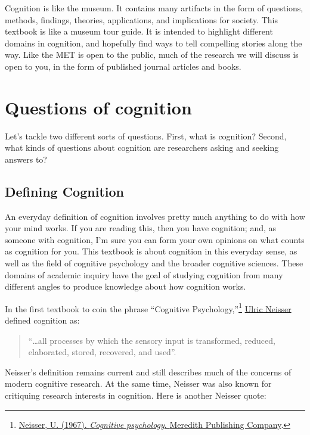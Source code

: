 \documentclass[
  oneside,
  12pt]{crumpbook}
\begin{document}
Cognition is like the museum. It contains many artifacts in the form of questions, methods, findings, theories, applications, and implications for society. This textbook is like a museum tour guide. It is intended to highlight different domains in cognition, and hopefully find ways to tell compelling stories along the way. Like the MET is open to the public, much of the research we will discuss is open to you, in the form of published journal articles and books.

\hypertarget{questions-of-cognition}{%
\section{Questions of cognition}\label{questions-of-cognition}}

Let's tackle two different sorts of questions. First, what is cognition? Second, what kinds of questions about cognition are researchers asking and seeking answers to?

\hypertarget{defining-cognition}{%
\subsection{Defining Cognition}\label{defining-cognition}}

An everyday definition of cognition involves pretty much anything to do with how your mind works. If you are reading this, then you have cognition; and, as someone with cognition, I'm sure you can form your own opinions on what counts as cognition for you. This textbook is about cognition in this everyday sense, as well as the field of cognitive psychology and the broader cognitive sciences. These domains of academic inquiry have the goal of studying cognition from many different angles to produce knowledge about how cognition works.

In the first textbook to coin the phrase ``Cognitive Psychology,''\footnote{\protect\hyperlink{ref-neisserCognitivePsychology1967}{Neisser, U. (1967). \emph{Cognitive psychology}. {Meredith Publishing Company}}.} \href{https://en.wikipedia.org/wiki/Ulric_Neisser}{Ulric Neisser} defined cognition as:

\begin{quote}
``\ldots all processes by which the sensory input is transformed, reduced, elaborated, stored, recovered, and used''.
\end{quote}

Neisser's definition remains current and still describes much of the concerns of modern cognitive research. At the same time, Neisser was also known for critiquing research interests in cognition. Here is another Neisser quote:
\end{document}
